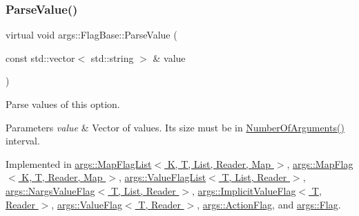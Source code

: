 \mbox{\label{classargs_1_1_flag_base_a3421d9a595c9426dc73f62604cdee84f}} 
\subsubsection{\texorpdfstring{Parse\+Value()}{ParseValue()}}
{\footnotesize\ttfamily virtual void args\+::\+Flag\+Base\+::\+Parse\+Value (\begin{DoxyParamCaption}\item[{const std\+::vector$<$ std\+::string $>$ \&}]{value }\end{DoxyParamCaption})\hspace{0.3cm}{\ttfamily [pure virtual]}}

Parse values of this option.


\begin{DoxyParams}{Parameters}
{\em value} & Vector of values. It\textquotesingle{}s size must be in \hyperlink{classargs_1_1_flag_base_a6007ffeaa767893cb8eff5333d61673b}{Number\+Of\+Arguments()} interval. \\
\hline
\end{DoxyParams}


Implemented in \hyperlink{classargs_1_1_map_flag_list_af37b4d7e420eabf62bd8dacafa86419c}{args\+::\+Map\+Flag\+List$<$ K, T, List, Reader, Map $>$}, \hyperlink{classargs_1_1_map_flag_a1f21b9227ab9b346b86f8533213a8272}{args\+::\+Map\+Flag$<$ K, T, Reader, Map $>$}, \hyperlink{classargs_1_1_value_flag_list_afbd3d460a8cee4c84d0a6210de068f83}{args\+::\+Value\+Flag\+List$<$ T, List, Reader $>$}, \hyperlink{classargs_1_1_nargs_value_flag_aa1ef4abaec468d69c89c02dd8bfdbf38}{args\+::\+Nargs\+Value\+Flag$<$ T, List, Reader $>$}, \hyperlink{classargs_1_1_implicit_value_flag_a4c3124a516ca870903c4788dce781292}{args\+::\+Implicit\+Value\+Flag$<$ T, Reader $>$}, \hyperlink{classargs_1_1_value_flag_af3a872ae8fb0fa34814cbc7e133aa9bf}{args\+::\+Value\+Flag$<$ T, Reader $>$}, \hyperlink{classargs_1_1_action_flag_abffb65449304c0799566c88c90adda0b}{args\+::\+Action\+Flag}, and \hyperlink{classargs_1_1_flag_a48ce8c59b554db36d2869b24b56c94dd}{args\+::\+Flag}.

\mbox{\label{classargs_1_1_flag_base_afd5a2cdea7f46caacc874c7c67ff6444}} 
